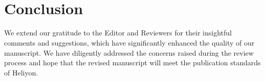 
\\
\\
\section*{Conclusion}
We extend our gratitude to the Editor and Reviewers for their insightful comments and suggestions, which have significantly enhanced the quality of our manuscript. We have diligently addressed the concerns raised during the review process and hope that the revised manuscript will meet the publication standards of Heliyon.\\